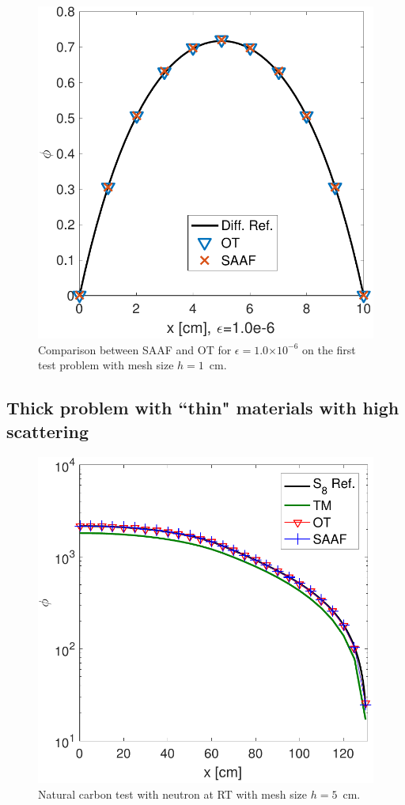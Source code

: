 \documentclass[review]{elsarticle}
\newcommand{\e}[1]{\ensuremath{\times 10^{#1}}}
\begin{document}
\begin{figure}[ht!]
	
	\centering
	\includegraphics[width=.75\linewidth]{PHY_DIF2.pdf}
	\caption{Comparison between SAAF and OT for $\epsilon=1.0\e{-6}$ on the first test problem {with mesh size $h=1$\ cm}.}
	\label{f:asymp2}
	
\end{figure}

\subsection{Thick problem with ``thin" materials with high scattering}
\begin{figure}[ht!]
	\centering
	\hspace*{0cm}\includegraphics[width=.75\linewidth]{PHY_DP.pdf}
	\caption{Natural carbon test with neutron at RT {with mesh size $h=5$\ cm.}}
	\label{bd1}
\end{figure}
\end{document}
